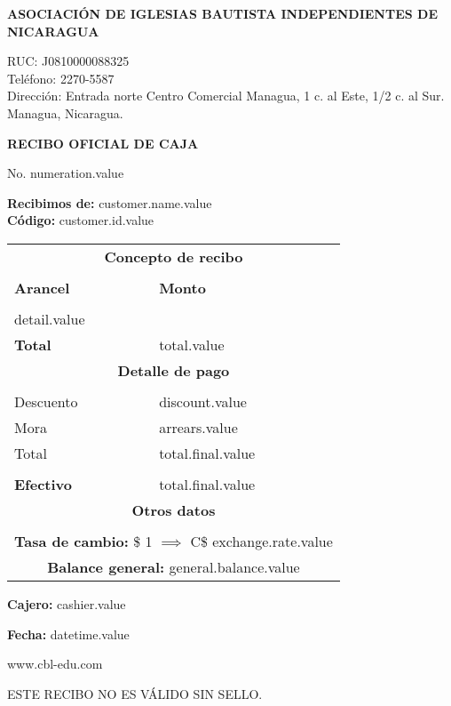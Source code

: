 \documentclass[11pt]{article}
\newcommand{\thenumber}{numeration.value}
\newcommand{\customerName}{customer.name.value}
\newcommand{\customerId}{customer.id.value}
\newcommand{\detail}{detail.value}
\newcommand{\total}{total.value}
\newcommand{\discountTotal}{discount.value}
\newcommand{\arrearsTotal}{arrears.value}
\newcommand{\finalTotal}{total.final.value}
\newcommand{\cashier}{cashier.value}
\newcommand{\datetime}{datetime.value}
\newcommand{\exchangeRate}{exchange.rate.value}
\newcommand{\generalBalance}{general.balance.value}
\begin{document}
    \begin{center}
        \textbf{ASOCIACIÓN DE IGLESIAS BAUTISTA INDEPENDIENTES DE NICARAGUA}\par
        {
            \small
            RUC: J0810000088325\\
            Teléfono: 2270-5587\\
            Dirección: Entrada norte Centro Comercial Managua, 1 c. al Este, 1/2 c. al Sur. Managua, Nicaragua.\par
        }
        \textbf{RECIBO OFICIAL DE CAJA}\par
        No. \thenumber
    \end{center}
    \textbf{Recibimos de:} \customerName\\
    \textbf{Código:} \customerId

    \begin{longtable}{p{3.8cm} p{1.8cm}}
        \hline
        \multicolumn{2}{c}{\textbf{Concepto de recibo}} \\\\
        \textbf{Arancel} & \textbf{Monto} \\\\
        \detail\\
        \textbf{Total} & \total\\
        \hline
        \multicolumn{2}{c}{\textbf{Detalle de pago}} \\\\
        Descuento & \discountTotal\\
        Mora & \arrearsTotal\\
        Total & \finalTotal\\\\
        \textbf{Efectivo} & \finalTotal\\
        \hline
        \multicolumn{2}{c}{\textbf{Otros datos}}\\\\
        \multicolumn{2}{c}{\textbf{Tasa de cambio:} \$ 1 $\implies$ C\$ \exchangeRate}\\
        \multicolumn{2}{c}{\textbf{Balance general:} \generalBalance}
    \end{longtable}
    
    \textbf{Cajero:} \cashier\par
    \textbf{Fecha:} \datetime
    \begin{center}
        www.cbl-edu.com\par
        ESTE RECIBO NO ES VÁLIDO SIN SELLO.
    \end{center}
\end{document}
